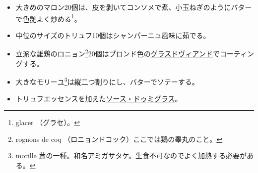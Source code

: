 \begin{recette}
\begin{itemize}
\item
  大きめのマロン20個は、皮を剥いてコンソメで煮、小玉ねぎのようにバターで色艶よく炒める\footnote{glacer
    （グラセ）。}。
\item
  中位のサイズのトリュフ10個はシャンパーニュ風味に茹でる。
\item
  立派な雄鶏のロニョン\footnote{rognons de coq
    （ロニョンドコック）ここでは鶏の睾丸のこと。}20個はブロンド色の\protect\hyperlink{glace-de-viande}{グラスドヴィアンド}でコーティングする。
\item
  大きなモリーユ\footnote{morille
    茸の一種。和名アミガサタケ。生食不可なのでよく加熱する必要がある。}は縦二つ割りにし、バターでソテーする。
\item
  トリュフエッセンスを加えた\protect\hyperlink{sauce-demi-glace}{ソース・ドゥミグラス}。
\end{itemize}

\hypertarget{garniture-Godard}{%
}
\end{recette}
